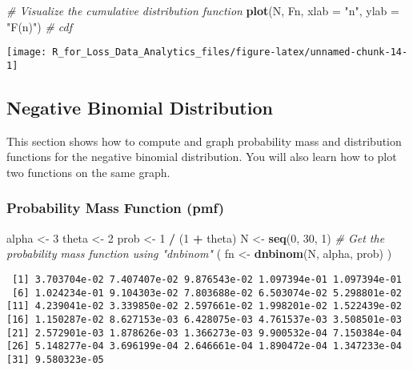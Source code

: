 \documentclass[]{book}
\newenvironment{Shaded}{\begin{snugshade}}{\end{snugshade}}
\newcommand{\KeywordTok}[1]{\textcolor[rgb]{0.13,0.29,0.53}{\textbf{#1}}}
\newcommand{\DataTypeTok}[1]{\textcolor[rgb]{0.13,0.29,0.53}{#1}}
\newcommand{\DecValTok}[1]{\textcolor[rgb]{0.00,0.00,0.81}{#1}}
\newcommand{\StringTok}[1]{\textcolor[rgb]{0.31,0.60,0.02}{#1}}
\newcommand{\CommentTok}[1]{\textcolor[rgb]{0.56,0.35,0.01}{\textit{#1}}}
\newcommand{\OperatorTok}[1]{\textcolor[rgb]{0.81,0.36,0.00}{\textbf{#1}}}
\newcommand{\NormalTok}[1]{#1}
\theoremstyle{definition}
\theoremstyle{definition}
\theoremstyle{definition}
\theoremstyle{remark}
\begin{document}
\begin{Shaded}
\begin{Highlighting}[]
\CommentTok{# Visualize the cumulative distribution function}
\KeywordTok{plot}\NormalTok{(N, Fn, }\DataTypeTok{xlab =} \StringTok{"n"}\NormalTok{, }\DataTypeTok{ylab =} \StringTok{"F(n)"}\NormalTok{) }\CommentTok{# cdf}
\end{Highlighting}
\end{Shaded}

\begin{center}\texttt{[image: R\_for\_Loss\_Data\_Analytics\_files/figure-latex/unnamed-chunk-14-1]} \end{center}

\subsection{Negative Binomial
Distribution}\label{negative-binomial-distribution}

This section shows how to compute and graph probability mass and
distribution functions for the negative binomial distribution. You will
also learn how to plot two functions on the same graph.

\subsubsection{Probability Mass Function
(pmf)}\label{probability-mass-function-pmf-1}

\begin{Shaded}
\begin{Highlighting}[]
\NormalTok{alpha <-}\StringTok{ }\DecValTok{3}
\NormalTok{theta <-}\StringTok{ }\DecValTok{2}
\NormalTok{prob <-}\StringTok{ }\DecValTok{1} \OperatorTok{/}\StringTok{ }\NormalTok{(}\DecValTok{1} \OperatorTok{+}\StringTok{ }\NormalTok{theta)}
\NormalTok{N <-}\StringTok{ }\KeywordTok{seq}\NormalTok{(}\DecValTok{0}\NormalTok{, }\DecValTok{30}\NormalTok{, }\DecValTok{1}\NormalTok{)}
\CommentTok{# Get the probability mass function using "dnbinom"}
\NormalTok{( fn <-}\StringTok{ }\KeywordTok{dnbinom}\NormalTok{(N, alpha, prob) )}
\end{Highlighting}
\end{Shaded}

\begin{verbatim}
 [1] 3.703704e-02 7.407407e-02 9.876543e-02 1.097394e-01 1.097394e-01
 [6] 1.024234e-01 9.104303e-02 7.803688e-02 6.503074e-02 5.298801e-02
[11] 4.239041e-02 3.339850e-02 2.597661e-02 1.998201e-02 1.522439e-02
[16] 1.150287e-02 8.627153e-03 6.428075e-03 4.761537e-03 3.508501e-03
[21] 2.572901e-03 1.878626e-03 1.366273e-03 9.900532e-04 7.150384e-04
[26] 5.148277e-04 3.696199e-04 2.646661e-04 1.890472e-04 1.347233e-04
[31] 9.580323e-05
\end{verbatim}
\end{document}
